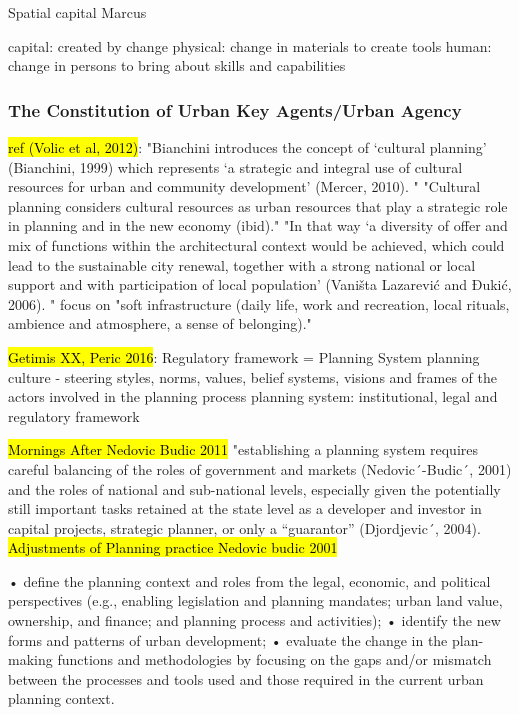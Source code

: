 \documentclass[11pt]{report}
\begin{document}
Spatial capital Marcus

\cite{Coleman 1988}
capital: created by change
    physical: change in materials to create tools
    human: change in persons to bring about skills and capabilities

\subsubsection{The Constitution of Urban Key Agents/Urban Agency}

\hl{ref (Volic et al, 2012)}:
"Bianchini introduces the concept of ‘cultural planning’ (Bianchini, 1999) which represents ‘a strategic and integral use of cultural  resources  for  urban  and  community development’ (Mercer, 2010). "
"Cultural  planning considers cultural resources as urban resources that play a strategic role in planning and in the
new economy (ibid)."
"In that way ‘a diversity of offer and mix of functions within the architectural context would be achieved, which could  lead  to  the  sustainable  city  renewal, together with a strong national or local support and  with  participation  of  local  population’ (Vaništa Lazarević and Đukić, 2006). "
focus on "soft infrastructure (daily  life, work and recreation, local rituals, ambience and atmosphere, a sense of belonging)."

\hl{Getimis XX, Peric 2016}:
Regulatory framework = Planning System
planning culture -  steering styles, norms, values, belief systems, visions and frames of the actors involved in the planning process
planning system: institutional, legal and regulatory framework

\hl{Mornings After Nedovic Budic 2011}
"establishing a planning system requires careful balancing of the roles of government and markets (Nedovic´-Budic´, 2001) and the roles of national and sub-national levels, especially given the potentially still important tasks retained at the state level as a developer and investor in capital projects, strategic planner, or only a “guarantor” (Djordjevic´, 2004).
\hl{Adjustments of Planning practice Nedovic budic 2001}

• deﬁne the planning context and roles from the legal, economic, and political perspectives (e.g., enabling legislation and planning mandates;
urban land value, ownership, and ﬁnance; and
planning process and activities);
• identify the new forms and patterns of urban development;
• evaluate the change in the plan-making functions and methodologies by focusing on the gaps and/or mismatch between the processes and tools used
and those required in the current urban planning context.
\end{document}
